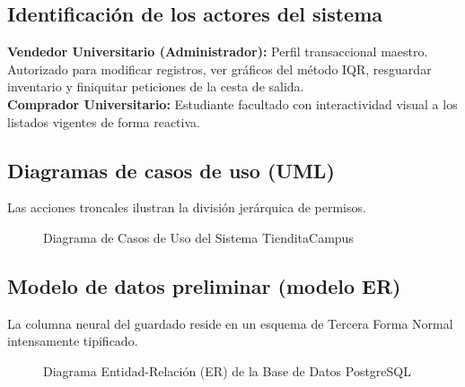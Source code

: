 \documentclass[12pt, a4paper]{article}
\begin{document}
\subsection{Identificación de los actores del sistema}
\textbf{Vendedor Universitario (Administrador):} Perfil transaccional maestro. Autorizado para modificar registros, ver gráficos del método IQR, resguardar inventario y finiquitar peticiones de la cesta de salida.\\
\textbf{Comprador Universitario:} Estudiante facultado con interactividad visual a los listados vigentes de forma reactiva. 

\subsection{Diagramas de casos de uso (UML)}
Las acciones troncales ilustran la división jerárquica de permisos.

\begin{figure}[H]
    \centering
    \caption{Diagrama de Casos de Uso del Sistema TienditaCampus}
    \label{fig:casos_uso}
\end{figure}

\subsection{Modelo de datos preliminar (modelo ER)}
La columna neural del guardado reside en un esquema de Tercera Forma Normal intensamente tipificado.

\begin{figure}[H]
    \centering
    \caption{Diagrama Entidad-Relación (ER) de la Base de Datos PostgreSQL}
    \label{fig:er_diagram}
\end{figure}
\end{document}
